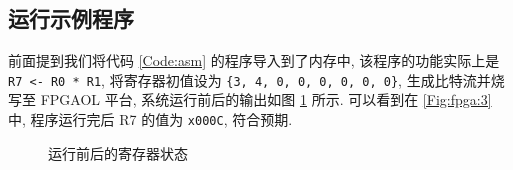 \documentclass[UTF8,fontset=fandol]{ctexart}
\begin{document}
\subsection*{运行示例程序}
前面提到我们将代码 \ref{Code:asm} 的程序导入到了内存中, 该程序的功能实际上是 \texttt{R7 <- R0 * R1}, 将寄存器初值设为 \texttt{\{3, 4, 0, 0, 0, 0, 0, 0\}}, 生成比特流并烧写至 FPGAOL 平台, 系统运行前后的输出如图 \ref{Fig:fpga} 所示. 可以看到在 \ref{Fig:fpga:3} 中, 程序运行完后 R7 的值为 \texttt{x000C}, 符合预期.

\begin{figure}
  \centering
  \caption{运行前后的寄存器状态}
  \label{Fig:fpga}
\end{figure}
\newpage
\end{document}
